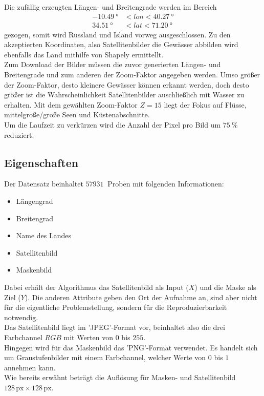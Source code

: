 Die zufällig erzeugten Längen- und Breitengrade werden im Bereich
\begin{align*}
    \SI{-10.49}{\degree} &< lon < \SI{40.27}{\degree} \\
    \SI{34.51}{\degree} &< lat < \SI{71.20}{\degree}
\end{align*}
gezogen, somit wird Russland und Island vorweg ausgeschlossen.
Zu den akzeptierten Koordinaten, also Satellitenbilder die Gewässer abbilden wird ebenfalls das Land mithilfe von Shapely\cite{shapely} ermittellt.
\\
Zum Download der Bilder müssen die zuvor generierten Längen- und Breitengrade und zum anderen der Zoom-Faktor angegeben werden.
Umso größer der Zoom-Faktor, desto kleinere Gewässer können erkannt werden, doch desto größer ist die Wahrscheinlichkeit Satellitenbilder auschließlich mit Wasser zu erhalten.
Mit dem gewählten Zoom-Faktor $Z = 15$ liegt der Fokus auf Flüsse, mittelgroße/große Seen und Küstenabschnitte.
\\
Um die Laufzeit zu verkürzen wird die Anzahl der Pixel pro Bild um $\SI{75}{\percent}$ reduziert.

\subsection{Eigenschaften}
Der Datensatz beinhaltet $\SI{57931}{}$ Proben mit folgenden Informationen:
\begin{itemize}
    \item Längengrad
    \item Breitengrad
    \item Name des Landes
    \item Satellitenbild
    \item Maskenbild
\end{itemize}
Dabei erhält der Algorithmus das Satellitenbild als Input ($X$) und die Maske als Ziel ($Y$).
Die anderen Attribute geben den Ort der Aufnahme an, sind aber nicht für die eigentliche Problemstellung, sondern für die Reproduzierbarkeit notwendig.
\\
Das Satellitenbild liegt im 'JPEG'-Format vor, beinhaltet also die drei Farbchannel $RGB$ mit Werten von $0$ bis $255$.
\\
Hingegen wird für das Maskenbild das 'PNG'-Format verwendet.
Es handelt sich um Graustufenbilder mit einem Farbchannel, welcher Werte von $0$ bis $1$ annehmen kann.
\\
Wie bereits erwähnt beträgt die Auflösung für Masken- und Satellitenbild $128 \, \text{px} \times 128 \, \text{px}$.